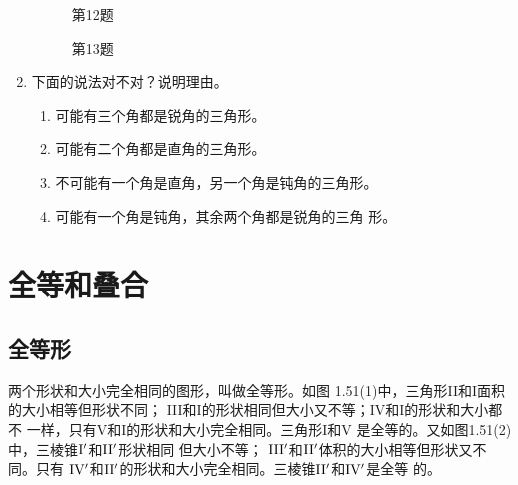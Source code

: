 \begin{enumerate}
\begin{figure}[htp]\centering
    \begin{minipage}[t]{0.48\textwidth}
    \centering
{}
    \caption*{第12题}
    \end{minipage}
    \begin{minipage}[t]{0.48\textwidth}
    \centering
    \caption*{第13题}
    \end{minipage}
    \end{figure}


\item 下面的说法对不对？说明理由。
\begin{enumerate}
\item 可能有三个角都是锐角的三角形。
\item 可能有二个角都是直角的三角形。
\item 不可能有一个角是直角，另一个角是钝角的三角形。
\item 可能有一个角是钝角，其余两个角都是锐角的三角
形。
\end{enumerate}
\end{enumerate}

\section{全等和叠合}

\subsection{全等形}
两个形状和大小完全相同的图形，叫做全等形。如图
1.51(1)中，三角形II和I面积的大小相等但形状不同；
III和I的形状相同但大小又不等；IV和I的形状和大小都不
一样，只有V和I的形状和大小完全相同。三角形I和V
是全等的。又如图1.51(2)中，三棱锥$\rm I'$和$\rm II'$形状相同
但大小不等；
$\rm III'$和$\rm II'$体积的大小相等但形状又不同。只有
$\rm IV'$和$\rm II'$的形状和大小完全相同。三棱锥$\rm II'$和$\rm IV'$是全等
的。

